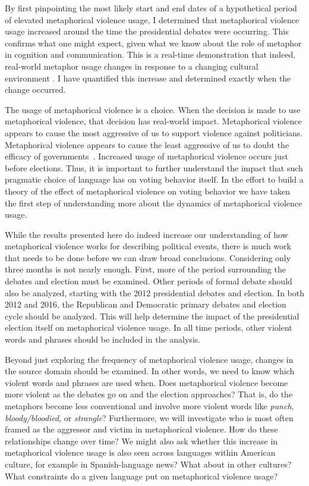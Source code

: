 By first pinpointing the most likely start and end dates of a hypothetical
period of elevated metaphorical violence usage, I determined that metaphorical
violence usage increased around the time the presidential debates were occurring.
This confirms what one might expect, given what we know about the role of
metaphor in cognition and communication. This is a real-time demonstration that
indeed, real-world metaphor usage changes in response to a changing cultural environment
\cite{Cameron2006, Gibbs2012a}. I have quantified this increase and determined
exactly when the change occurred.

The usage of metaphorical violence is a choice. When the decision is made to
use metaphorical violence, that decision has real-world impact. Metaphorical
violence appears to cause the most aggressive of us to support violence against politicians.
Metaphorical violence appears to cause the least aggressive of us to doubt
the efficacy of governments~\cite{Kalmoe2014}. Increased usage of metaphorical violence 
occurs just before elections. Thus, it is important to further understand the impact
that such pragmatic choice of language has on voting behavior itself. In the effort
to build a theory of the effect of metaphorical violence on voting 
behavior we have taken the first step of understanding more about the
dynamics of metaphorical violence usage.

While the results presented here do indeed increase our understanding of how
metaphorical violence works for describing political events, there is much work
that needs to be done before we can draw broad conclusions. Considering only 
three months is not nearly enough. First, more of the period surrounding the
debates and election must be examined. Other periods of formal debate should
also be analyzed, starting with the 2012 presidential debates and election. 
In both 2012 and 2016, the Republican and Democratic primary debates and
election cycle should be analyzed. This will help determine the impact of 
the presidential election itself on metaphorical violence usage. 
In all time periods, other violent words and phrases should be included in the analysis.

Beyond just exploring the frequency of metaphorical violence usage, changes in
the source domain should be examined. In other words, we need to know which 
violent words and phrases are used when. Does metaphorical violence become 
more violent as the debates go on and the election approaches? 
That is, do the metaphors become less conventional and involve
more violent words like \textit{punch}, \textit{bloody/bloodied}, or \textit{strangle}?
Furthermore, we will investigate who is most often framed as the 
aggressor and victim in metaphorical violence.
How do these relationships change over time? We might also ask
whether this increase in metaphorical violence usage is also seen across languages
within American culture, for example in Spanish-language news? What about in
other cultures? What constraints do a given language put on metaphorical violence
usage?

